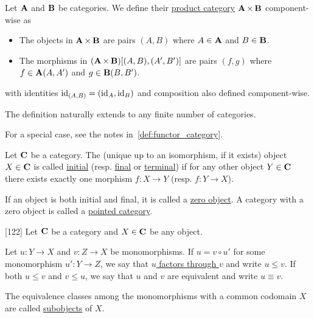 \begin{definition}\label{def:product_category}\cite[exercise 1.1.14]{Leinster2014}
  Let $\operatorname{\mathbf{A}}$ and $\operatorname{\mathbf{B}}$ be categories. We define their \ul{product category} $\operatorname{\mathbf{A}} \times \operatorname{\mathbf{B}}$ component-wise as
  \begin{itemize}
    \item The objects in $\operatorname{\mathbf{A}} \times \operatorname{\mathbf{B}}$ are pairs $(A, B)$ where $A \in \operatorname{\mathbf{A}}$ and $B \in \operatorname{\mathbf{B}}$.
    \item The morphisms in $(\operatorname{\mathbf{A}} \times \operatorname{\mathbf{B}})[(A, B), (A', B')]$ are pairs $(f, g)$ where $f \in \operatorname{\mathbf{A}}(A, A')$ and $g \in \operatorname{\mathbf{B}}(B, B')$.
  \end{itemize}
  with identities $\operatorname{id}_{(A,B)} =(\operatorname{id}_A, \operatorname{id}_B)$ and composition also defined component-wise.

  The definition naturally extends to any finite number of categories.

  For a special case, see the notes in~\cref{def:functor_category}.
\end{definition}

\begin{definition}\label{def:initial_final_objects}\cite[definitions 2.1.7]{Leinster2014}
  Let $\operatorname{\mathbf{C}}$ be a category. The (unique up to an isomorphism, if it exists) object $X \in \operatorname{\mathbf{C}}$ is called \ul{initial} (resp. \ul{final} or \ul{terminal}) if for any other object $Y \in \operatorname{\mathbf{C}}$ there exists exactly one morphism $f: X \to Y$ (resp. $f: Y \to X$).

  If an object is both initial and final, it is called a \ul{zero object}. A category with a zero object is called a \ul{pointed category}.
\end{definition}

\begin{definition}\label{def:categorical_subobject}\cite{MacLane1994}[122]
  Let $\operatorname{\mathbf{C}}$ be a category and $X \in \operatorname{\mathbf{C}}$ be any object.

  Let $u: Y \to X$ and $v: Z \to X$ be monomorphisms. If $u = v \circ u'$ for some monomorphism $u': Y \to Z$, we say that \ul{$u$ factors through $v$} and write $u \leq v$. If both $u \leq v$ and $v \leq u$, we say that $u$ and $v$ are equivalent and write $u \equiv v$.

  The equivalence classes among the monomorphisms with a common codomain $X$ are called \ul{subobjects} of $X$.
\end{definition}
